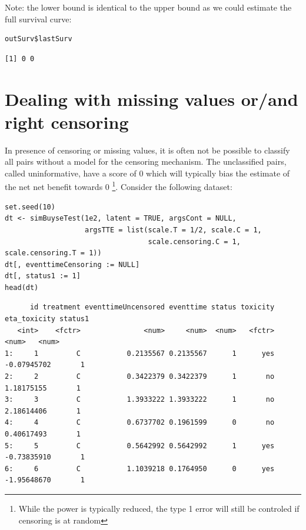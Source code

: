 \documentclass[12pt]{article}
\begin{document}
Note: the lower bound is identical to the upper bound as we could
estimate the full survival curve:
\lstset{language=r,label= ,caption= ,captionpos=b,numbers=none}
\begin{lstlisting}
outSurv$lastSurv
\end{lstlisting}

\begin{verbatim}
[1] 0 0
\end{verbatim}


\clearpage

\section{Dealing with missing values or/and right censoring}
\label{sec:org5fc00a3}

In presence of censoring or missing values, it is often not be
 possible to classify all pairs without a model for the censoring
 mechanism. The unclassified pairs, called uninformative, have a score
 of 0 which will typically bias the estimate of the net net benefit
 towards 0 \footnote{While the power is typically reduced, the type 1 error
 will still be controled if censoring is at random}. Consider the
 following dataset:
\lstset{language=r,label= ,caption= ,captionpos=b,numbers=none}
\begin{lstlisting}
set.seed(10)
dt <- simBuyseTest(1e2, latent = TRUE, argsCont = NULL,
                   argsTTE = list(scale.T = 1/2, scale.C = 1,
                                  scale.censoring.C = 1, scale.censoring.T = 1))
dt[, eventtimeCensoring := NULL]
dt[, status1 := 1]
head(dt)
\end{lstlisting}

\begin{verbatim}
      id treatment eventtimeUncensored eventtime status toxicity eta_toxicity status1
   <int>    <fctr>               <num>     <num>  <num>   <fctr>        <num>   <num>
1:     1         C           0.2135567 0.2135567      1      yes  -0.07945702       1
2:     2         C           0.3422379 0.3422379      1       no   1.18175155       1
3:     3         C           1.3933222 1.3933222      1       no   2.18614406       1
4:     4         C           0.6737702 0.1961599      0       no   0.40617493       1
5:     5         C           0.5642992 0.5642992      1      yes  -0.73835910       1
6:     6         C           1.1039218 0.1764950      0      yes  -1.95648670       1
\end{verbatim}
\end{document}
